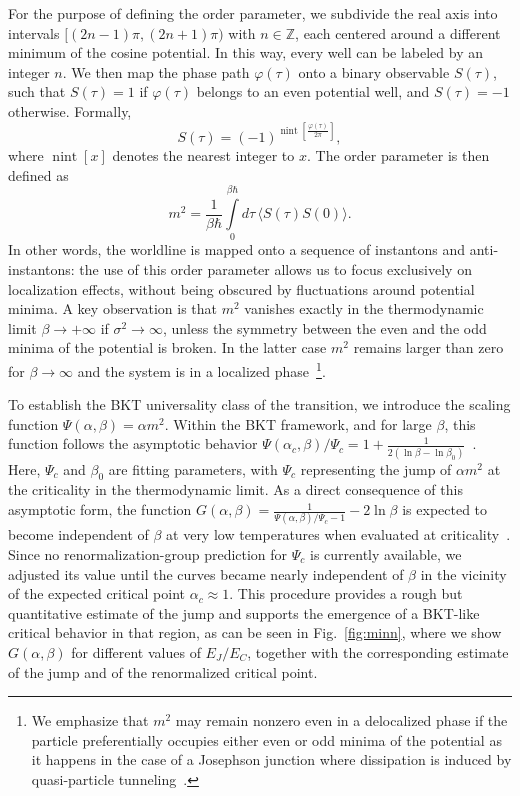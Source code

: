 \documentclass[aps,notitlepage,twocolumn,prl,nolongbibliography,superscriptaddress]{revtex4-2}
\newcommand{\thermal}[1]{\langle #1 \rangle}
\newcommand{\nint}{\operatorname{nint}}
\begin{document}
For the purpose of defining the order parameter, we subdivide the real axis into intervals $[(2n-1)\pi,(2n+1)\pi)$ with $n \in \mathbb{Z}$, each centered around a different minimum of the cosine potential. In this way, every well can be labeled by an integer $n$. We then map the phase path $\varphi(\tau)$ onto a binary observable $S(\tau)$, such that $S(\tau)=1$ if $\varphi(\tau)$ belongs to an even potential well, and $S(\tau)=-1$ otherwise. Formally,
\begin{equation}
     S(\tau)=(-1)^{\nint\left[\frac{\varphi(\tau)}{2\pi}\right]},
\end{equation}
where $\nint[x]$ denotes the nearest integer to $x$. The order parameter is then defined as
\begin{equation}
m^2=\frac{1}{\beta\hbar}\int\limits_0^{\beta\hbar}d\tau\,\thermal{S(\tau)S(0)}.
\end{equation}
In other words, the worldline is mapped onto a sequence of instantons and anti-instantons: the use of this order parameter allows us to focus exclusively on localization effects, without being obscured by fluctuations around potential minima. A key observation is that $m^2$ vanishes exactly in the thermodynamic limit $\beta \to +\infty$ if $\sigma^2 \to \infty$, unless the symmetry between the even and the odd minima of the potential is broken. In the latter case $m^2$ remains larger than zero for $\beta \to \infty$ and the system is in a localized phase~\footnote{We emphasize that $m^2$ may remain nonzero even in a delocalized phase if the particle preferentially occupies either even or odd minima of the potential as it happens in the case of a Josephson junction where dissipation is induced by quasi-particle tunneling~\cite{Capone}.}.

To establish the BKT universality class of the transition, we introduce the scaling function $\Psi(\alpha,\beta)=\alpha m^2$. Within the BKT framework, and for large $\beta$, this function follows the asymptotic behavior $\Psi(\alpha_c,\beta)/\Psi_c = 1 + \frac{1}{2(\ln \beta - \ln \beta_0)}$~\cite{Minn_PRB1,Minn_PRL,Minn_PRB2}. Here, $\Psi_c$ and $\beta_0$ are fitting parameters, with $\Psi_c$ representing the jump of $\alpha m^2$ at the criticality in the thermodynamic limit. As a direct consequence of this asymptotic form, the function $G(\alpha,\beta)=\frac{1}{\Psi(\alpha,\beta)/\Psi_c-1}-2\ln\beta$ is expected to become independent of $\beta$ at very low temperatures when evaluated at criticality~\cite{Grazia_Comm_phys, Giulio_PRL, Giulio_manyspin_PRB,Giulio_spinboson_PRB}. Since no renormalization-group prediction for $\Psi_c$ is currently available, we adjusted its value until the curves became nearly independent of $\beta$ in the vicinity of the expected critical point $\alpha_c \approx 1$. This procedure provides a rough but quantitative estimate of the jump and supports the emergence of a BKT-like critical behavior in that region, as can be seen in Fig.~\ref{fig:minn}, where we show $G(\alpha, \beta)$ for different values of $E_J/E_C$, together with the corresponding estimate of the jump and of the renormalized critical point.
\end{document}

